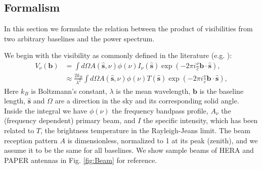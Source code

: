 \documentclass[twocolumn,apj,numberedappendix]{emulateapj}
\renewcommand\[{\begin{equation}}
\renewcommand\]{\end{equation}}
\begin{document}
\subsection{Formalism}
In this section we formulate the relation between 
the product of visibilities from two arbitrary baselines and the power spectrum. 

We begin with the visibility as commonly defined in the literature (e.g.
\citealt{first-paper}): 
\begin{equation}
\begin{aligned}V_{\nu}(\boldsymbol{b}) & =\int d\Omega A(\hat{\boldsymbol{s}},\nu)\phi(\nu)I_{\nu}(\hat{\boldsymbol{s}})\exp\left(-2\pi i\frac{\nu}{c}\boldsymbol{b}\cdot\hat{\boldsymbol{s}}\right),\\
 & \approx\frac{2k_{B}}{\lambda^{2}}\int d\Omega A(\hat{\boldsymbol{s}},\nu)\phi(\nu)T(\hat{\boldsymbol{s}})\exp\left(-2\pi i\frac{\nu}{c}\boldsymbol{b}\cdot\hat{\boldsymbol{s}}\right),
\end{aligned}
\label{eq:Vis1}
\end{equation}
Here $k_B$ is Boltzmann's constant, $\lambda$ is the mean wavelength, $\boldsymbol{b}$ is the baseline length, $\hat{\boldsymbol{s}}$ and $\Omega$ are a direction in the
sky and its corresponding solid angle. Inside the integral we have $\phi(\nu)$ the frequency bandpass profile, $A_{\nu}$ the (frequency
dependent) primary beam, and $I$ the specific intensity, which has been
related to $T$, the brightness temperature in the Rayleigh-Jeans
limit. The beam reception pattern $A$ is dimensionless,
normalized to 1 at its peak (zenith), and we assume it to be the same
for all baselines. We show sample beams of HERA and PAPER antennas in Fig. \ref{fig:Beam} for reference. 
\end{document}

